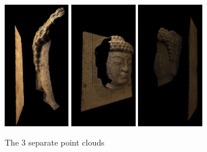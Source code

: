\begin{figure}
\begin{center}
\includegraphics[height=55mm]{FIGS/Boudhas/Clou-5564.jpg}
\includegraphics[height=55mm]{FIGS/Boudhas/Clou-5586.jpg}
\includegraphics[height=55mm]{FIGS/Boudhas/Clou-5581.jpg}
\caption{The $3$ separate point clouds}
\label{BOUDHA:CLOUD:OUTPUT:SEP}
\end{center}
\end{figure}


